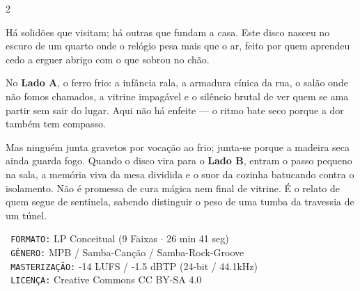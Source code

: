 \documentclass[10pt]{article}
\begin{document}
\vspace{0.25cm}
\noindent{\color{vinylochre}\rule{\textwidth}{0.6pt}}
\vspace{0.2cm}

\begin{multicols}{2}
  \par\vspace{0.12cm}

  Há solidões que visitam; há outras que fundam a casa. Este disco nasceu no escuro de um quarto onde o relógio pesa mais que o ar, feito por quem aprendeu cedo a erguer abrigo com o que sobrou no chão.\par\vspace{0.15cm}

  No \textbf{Lado A}, o ferro frio: a infância rala, a armadura cínica da rua, o salão onde não fomos chamados, a vitrine impagável e o silêncio brutal de ver quem se ama partir sem sair do lugar. Aqui não há enfeite — o ritmo bate seco porque a dor também tem compasso.\par\vspace{0.15cm}

  Mas ninguém junta gravetos por vocação ao frio; junta-se porque a madeira seca ainda guarda fogo. Quando o disco vira para o \textbf{Lado B}, entram o passo pequeno na sala, a memória viva da mesa dividida e o suor da cozinha batucando contra o isolamento. Não é promessa de cura mágica nem final de vitrine. É o relato de quem segue de sentinela, sabendo distinguir o peso de uma tumba da travessia de um túnel.

  \columnbreak

  \par\vspace{0.12cm}

  \noindent\texttt{\footnotesize\color{vinylmuted} FORMATO:} LP Conceitual (9 Faixas $\cdot$ 26 min 41 seg)\\
  \texttt{\footnotesize\color{vinylmuted} GÊNERO:} MPB / Samba-Canção / Samba-Rock-Groove\\
  \texttt{\footnotesize\color{vinylmuted} MASTERIZAÇÃO:} -14 LUFS / -1.5 dBTP (24-bit / 44.1kHz)\\
  \texttt{\footnotesize\color{vinylmuted} LICENÇA:} Creative Commons CC BY-SA 4.0


\end{multicols}
\end{document}
